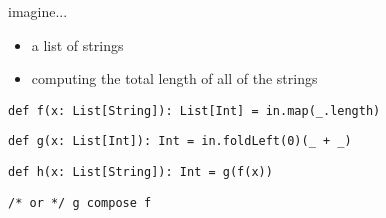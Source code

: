 \documentclass[include/preamble.tex]{subfiles}
\begin{document}
\begin{frame}[fragile]
  \begin{center}
    \begin{flushleft}
      imagine...
    \end{flushleft}
    \begin{itemize}
      \pause
    \item a list of strings
      \pause
    \item computing the total length of all of the strings
    \end{itemize}
  \end{center}
\end{frame}

\begin{frame}[fragile]
  \begin{center}
    \newline
    \newline
    \begin{flushleft}

      \begin{lrbox}{\boxA}
        \begin{lstlisting}[style=scala]
def f(x: List[String]): List[Int] = in.map(_.length)
        \end{lstlisting}
      \end{lrbox}

      \begin{lrbox}{\boxB}
        \begin{lstlisting}[style=scala]
def g(x: List[Int]): Int = in.foldLeft(0)(_ + _)
        \end{lstlisting}
      \end{lrbox}

      \begin{lrbox}{\boxC}
        \begin{lstlisting}[style=scala]
def h(x: List[String]): Int = g(f(x))
        \end{lstlisting}
      \end{lrbox}

      \begin{lrbox}{\boxD}
        \begin{lstlisting}[style=scala]
                     /* or */ g compose f
        \end{lstlisting}
      \end{lrbox}


\end{flushleft}
\end{center}
\end{frame}
\end{document}
